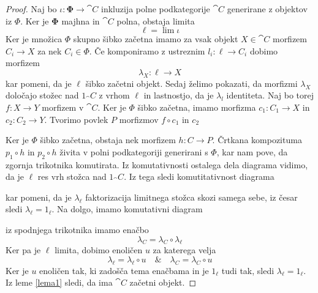 \begin{proof}
Naj bo $\iota : \bm{\Phi} \to \cat{C}$ inkluzija polne podkategorije $\cat{C}$ generirane z objektov iz $\Phi$. Ker je $\bm{\Phi}$ majhna in $\cat{C}$ polna, obstaja limita
$$\ell = \lim \iota$$
Ker je množica $\Phi$ skupno šibko začetna imamo za vsak objekt $X \in \cat{C}$ morfizem $C_i \to X$ za nek $C_i \in \Phi$. Če komponiramo z ustreznim $l_i : \ell \to C_i$ dobimo morfizem
$$\lambda_X : \ell \to X$$
kar pomeni, da je $\ell$ šibko začetni objekt. Sedaj želimo pokazati, da morfizmi $\lambda_X$ določajo stožec nad $1_\cat{C}$ z vrhom $\ell$ in lastnostjo, da je $\lambda_l$ identiteta. Naj bo torej $f : X \to Y$ morfizem v $\cat{C}$. Ker je $\Phi$ šibko začetna, imamo morfizma $c_1 : C_1 \to X$ in $c_2 : C_2 \to Y$. Tvorimo povlek $P$ morfizmov $f \circ c_1$ in $c_2$
\begin{center}
\end{center}
Ker je $\Phi$ šibko začetna, obstaja nek morfizem $h : C \to P$. Črtkana kompozituma $p_1 \circ h$ in $p_2 \circ h$ živita v polni podkategoriji generirani s $\Phi$, kar nam pove, da zgornja trikotnika komutirata. Iz komutativnosti ostalega dela diagrama vidimo, da je $\ell$ res vrh stožca nad $1_\cat{C}$. Iz tega sledi komutitativnost diagrama
\begin{center}
\end{center}
kar pomeni, da je $\lambda_\ell$ faktorizacija limitnega stožca skozi samega sebe, iz česar sledi $\lambda_\ell = 1_\ell$. Na dolgo, imamo komutativni diagram
\begin{center}
\end{center}
iz spodnjega trikotnika imamo enačbo
$$\lambda_C = \lambda_C \circ \lambda_\ell$$
Ker pa je $\ell$ limita, dobimo enoličen $u$ za katerega velja
$$\lambda_\ell = \lambda_\ell \circ u \quad \& \quad \lambda_C = \lambda_C \circ u$$
Ker je $u$ enoličen tak, ki zadošča tema enačbama in je $1_\ell$ tudi tak, sledi $\lambda_\ell = 1_\ell$. Iz leme \ref{lema1} sledi, da ima $\cat{C}$ začetni objekt.
\end{proof}
